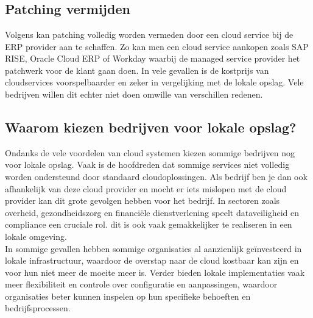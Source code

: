 
\chapter{}
\label{ch:corpus}

\section{Patching vermijden}

Volgens \textcite{Munck2024} kan patching volledig worden vermeden door een cloud service bij de ERP provider aan te schaffen. Zo kan men een cloud service aankopen zoals SAP RISE, Oracle Cloud ERP of Workday waarbij de 
managed service provider het patchwerk voor de klant gaan doen. In vele gevallen is de kostprijs van cloudservices voorspelbaarder en zeker in vergelijking met de lokale opslag. Vele bedrijven
 willen dit echter niet doen omwille van verschillen redenen.\\


\section{Waarom kiezen bedrijven voor lokale opslag?}
Ondanks de vele voordelen van cloud systemen kiezen sommige bedrijven nog voor lokale opslag. Vaak is de hoofdreden dat sommige services niet volledig worden ondersteund door standaard cloudoplossingen. Als bedrijf ben je dan ook afhankelijk van deze cloud provider en mocht er iets mislopen met de cloud provider kan dit grote gevolgen hebben voor het bedrijf.
In sectoren zoals overheid, gezondheidszorg en financiële dienstverlening speelt dataveiligheid en compliance een cruciale rol. dit is ook vaak gemakkelijker te realiseren in een lokale omgeving.\\ 
In sommige gevallen hebben sommige organisaties al aanzienlijk geïnvesteerd in lokale infrastructuur, waardoor de overstap naar de cloud kostbaar kan zijn en voor hun niet meer de moeite meer is.
Verder bieden lokale implementaties vaak meer flexibiliteit en controle over configuratie en aanpassingen, waardoor organisaties beter kunnen inspelen op hun specifieke behoeften en 
bedrijfsprocessen.\\



